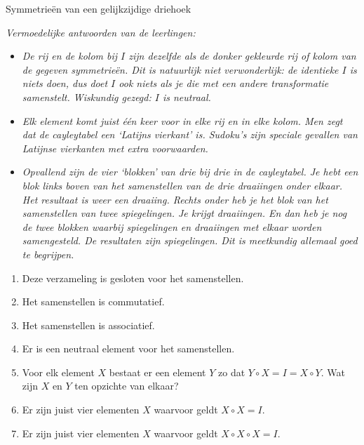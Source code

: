 \begin{lesactiviteit}{Symmetrieën van een gelijkzijdige driehoek}
\begin{vraagenantwoord}[resume]
		\emph{Vermoedelijke antwoorden van de leerlingen:}
		
		\begin{itemize}
		
		    \item \emph{De rij en de kolom bij $I$ zijn dezelfde als de donker gekleurde rij of kolom van de gegeven symmetrieën. Dit is natuurlijk niet verwonderlijk: de identieke $I$ is niets doen, dus doet $I$ ook niets als je die met een andere transformatie samenstelt. Wiskundig gezegd: $I$ is neutraal.}
		    
		    \item \emph{Elk element komt juist één keer voor in elke rij en in elke kolom. Men zegt dat de cayleytabel een `Latijns vierkant' is. Sudoku's zijn speciale gevallen van Latijnse vierkanten met extra voorwaarden.}
		    
		    \item \emph{Opvallend zijn de vier `blokken' van drie bij drie in de cayleytabel. Je hebt een blok links boven van het samenstellen van de drie draaiingen onder elkaar. Het resultaat is weer een draaiing. Rechts onder heb je het blok van het samenstellen van twee spiegelingen. Je krijgt draaiingen. En dan heb je nog de twee blokken waarbij spiegelingen en draaiingen met elkaar worden samengesteld. De resultaten zijn spiegelingen. Dit is meetkundig allemaal goed te begrijpen.}
		    
	    \end{itemize}
		
		
		\begin{enumerate}
		    \item Deze verzameling is gesloten voor het samenstellen.
		    \item Het samenstellen is commutatief.
		    \item Het samenstellen is associatief.
		    \item Er is een neutraal element voor het samenstellen.
		    \item Voor elk element $X$ bestaat er een element $Y$ zo dat $Y\circ X=I=X\circ Y$. Wat zijn $X$ en $Y$ ten opzichte van elkaar?
			\item Er zijn juist vier elementen $X$ waarvoor geldt $X\circ X=I$.
		    \item Er zijn juist vier elementen $X$ waarvoor geldt $X\circ X\circ X=I$.
		\end{enumerate}	
			

\end{vraagenantwoord}
\end{lesactiviteit}
